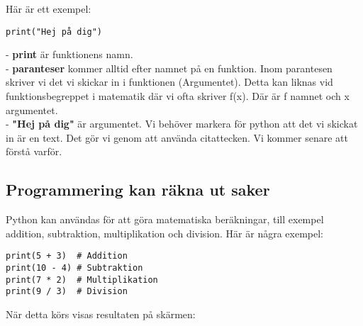 Här är ett exempel:
\begin{lstlisting}[title=Syntax för print()]
print("Hej på dig")
\end{lstlisting}

- \textbf{print} är funktionens namn. \\
- \textbf{paranteser} kommer alltid efter namnet på en funktion. Inom parantesen skriver vi det vi skickar in i funktionen (Argumentet). Detta kan liknas vid funktionsbegreppet i matematik där vi ofta skriver f(x). Där är f namnet och x argumentet. \\
- \textbf{"Hej på dig"} är argumentet. Vi behöver markera för python att det vi skickat in är en text. Det gör vi genom att använda citattecken. Vi kommer senare att förstå varför. 



\subsection{Programmering kan räkna ut saker}
Python kan användas för att göra matematiska beräkningar, till exempel addition, subtraktion, multiplikation och division. 
Här är några exempel:

\begin{lstlisting}[title=Matematik i Python]
print(5 + 3)  # Addition
print(10 - 4) # Subtraktion
print(7 * 2)  # Multiplikation
print(9 / 3)  # Division
\end{lstlisting}


När detta körs visas resultaten på skärmen:



